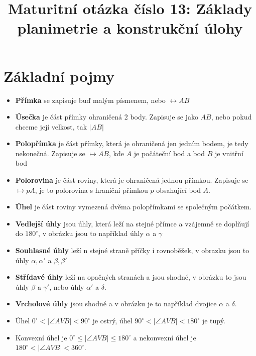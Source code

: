 \documentclass[12pt]{article}
\title{Maturitní otázka číslo 13: Základy planimetrie a konstrukční úlohy}
\author{}
\date{}
\begin{document}
\maketitle
\section*{Základní pojmy}
\begin{itemize}
    \item \textbf{Přímka} se zapisuje buď malým písmenem, nebo $\leftrightarrow AB$
    \item \textbf{Úsečka} je část přímky ohraničená 2 body. Zapisuje se jako $AB$, nebo pokud chceme její velkost, tak $|AB|$
    \item \textbf{Polopřímka} je část přímky, která je ohraničená jen jedním bodem, je tedy nekonečná. Zapisuje se $\mapsto AB$, kde $A$ je počáteční bod a bod $B$ je vnitřní bod
    \item \textbf{Polorovina} je část roviny, která je ohraničená jednou přímkou. Zapisuje se $\mapsto pA$, je to polorovina s hraniční přímkou $p$ obsahující bod $A$. 
    \item \textbf{Úhel} je část roviny vymezená dvěma polopřímkami se společným počátkem.
    \item \textbf{Vedlejší úhly} jsou úhly, která leží na stejné přímce a vzájemně se doplňují do $180^\circ$, v obrázku jsou to například úhly $\alpha$ a $\gamma$
    \item \textbf{Souhlasné úhly} leží n stejné straně příčky i rovnoběžek, v obrazku jsou to úhly $\alpha , \alpha'$ a $\beta, \beta'$
    \item \textbf{Střídavé úhly} leží na opačných stranách a jsou shodné, v obrázku to jsou úhly $\beta$ a $\gamma'$, nebo úhly $\alpha'$ a $\delta $.
    \item \textbf{Vrcholové úhly} jsou shodné a v obrázku je to například dvojice $\alpha$ a $\delta$.
    \item Úhel $0^\circ < |\angle AVB| < 90^\circ$ je ostrý, úhel $90^\circ < |\angle AVB| < 180^\circ$ je tupý.
    \item Konvexní úhel je $0^\circ \leq |\angle AVB| \leq 180^\circ$ a nekonvexní úhel je $180^\circ <|\angle AVB| < 360^\circ$.
\end{itemize}
\end{document}
